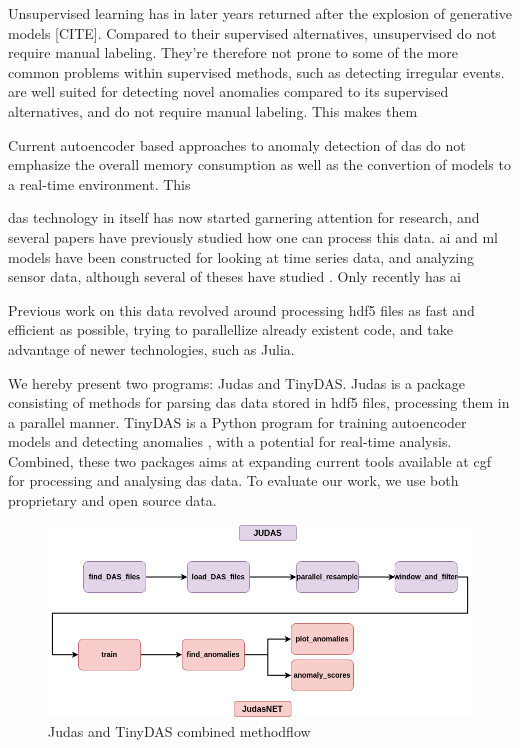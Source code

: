 Unsupervised learning has in later years returned after the explosion of generative models [CITE]. Compared to their supervised alternatives, unsupervised do not require manual labeling. They're therefore not prone to some of the more common problems within supervised methods, such as detecting irregular events.   are well suited for detecting novel anomalies \cite{wei2022lstmautoencoder, srivastava2016unsupervised} compared to its supervised alternatives, and do not require manual labeling. This makes them 

Current autoencoder based approaches to anomaly detection of \acrshort{das} do not emphasize the overall memory consumption as well as the convertion of models to a real-time environment. This 

\acrshort{das} technology in itself has now started garnering attention for research, and several papers have previously studied  how one can process this data. \acrshort{ai} and \acrshort{ml} models have been constructed for looking at time series data, and analyzing sensor data, although several of theses have studied .  Only recently has \acrshort{ai}

Previous work on this data \cite{projthesis} revolved around processing \acrshort{hdf5} files as fast and efficient as possible, trying to parallellize already existent code, and take advantage of newer technologies, such as Julia.


We hereby present two programs: Judas and TinyDAS. Judas is a package consisting of methods for parsing \acrshort{das} data stored in \acrfull{hdf5} files,  processing them in a parallel manner. TinyDAS is a Python program for training autoencoder models and detecting anomalies , with a potential for real-time analysis. Combined, these two packages aims at expanding current tools available at \acrshort{cgf} for processing and analysing \acrshort{das} data. To evaluate our work, we use both proprietary and open source data. 

\begin{figure}[h]
    \centering
    \includegraphics[scale=.5]{figures/api_overview.png}
    \caption{Judas and TinyDAS combined methodflow}
    \label{fig:judasnet_overview}
\end{figure}